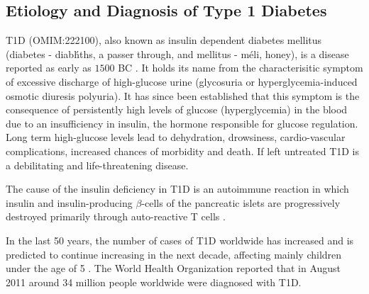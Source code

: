 \subsection*{Etiology and Diagnosis of Type 1 Diabetes}

\Gls{T1D} (OMIM:222100), also known as insulin dependent diabetes mellitus (diabetes - \foreignlanguage{greek}{diab\'hths},
a passer through, and mellitus - \foreignlanguage{greek}{m\'eli}, honey), is a disease reported as early as $1500$ BC \citep{Poretsky:2010wr}.
It holds its name from the characterisitic symptom of excessive discharge of high-glucose urine (glycosuria or hyperglycemia-induced osmotic diuresis polyuria).
It has since been established that this symptom is the consequence of persistently high levels of glucose (hyperglycemia) in the blood due to an insufficiency in insulin,
the hormone responsible for glucose regulation.
Long term high-glucose levels lead to dehydration, drowsiness, cardio-vascular complications, increased chances of morbidity and death.  
If left untreated T1D is a debilitating and life-threatening disease.

The cause of the insulin deficiency in T1D is an autoimmune reaction in which insulin and insulin-producing $\beta$-cells of the pancreatic islets
are progressively destroyed primarily through auto-reactive T cells \citep{Todd:2010bl}.


In the last 50 years, the number of cases of T1D worldwide has increased and is predicted to continue increasing in the next decade,
affecting mainly children under the age of 5
\cite{Patterson:2009gj}.
The World Health Organization reported that in August 2011 around 34 million people worldwide were diagnosed with T1D.

